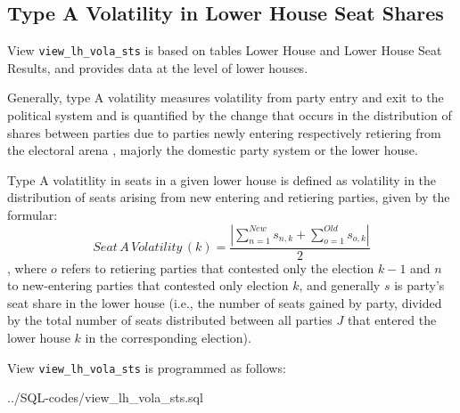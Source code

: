\subsection{Type A Volatility in Lower House Seat Shares}\label{view_lh_vola_sts}
View \texttt{\footnotesize view\_lh\_vola\_sts} is based on tables Lower House and Lower House Seat Results, and provides data at the level of lower houses.

Generally, type A volatility measures volatility from party entry and exit to the political system and is quantified by the change that occurs in the distribution of shares between parties due to parties newly entering respectively retiering from the electoral arena \citep{Powell&Tucker2013}, majorly the domestic party system or the lower house. 

Type A volatitlity in seats in a given lower house is defined as volatility in the distribution of seats arising from new entering and retiering parties, given by the formular: 
\begin{equation}\label{equ_seat_a_volatility}
Seat\,A\,Volatility\,(k) = \frac{ | \sum\limits_{n=1}^{New} s_{n,k} + \sum\limits_{o=1}^{Old} s_{o,k} | }{2}
\end{equation}
, where $o$ refers to retiering parties that contested only the election $k-1$ and $n$ to new-entering
parties that contested only election $k$, and generally $s$ is party's seat share in the lower house (i.e., the number of seats gained by party, divided by the total number of seats distributed between all parties $J$ that entered the lower house $k$ in the corresponding election).




View \texttt{\footnotesize view\_lh\_vola\_sts} is programmed as follows:

%
{../SQL-codes/view_lh_vola_sts.sql}


